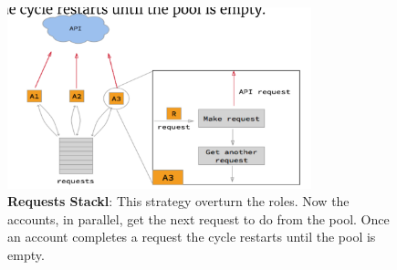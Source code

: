 \documentclass[10pt,a4paper]{article}
\begin{document}
 \pagebreak
     \begin{figure}[ht!]
 \hfill \includegraphics[width=250pt]{images/multi-account-stack}
 \hspace*{\fill}
 \caption{\textbf{Requests Stackl}: This strategy overturn the roles. Now the accounts, in parallel, get the next request to do from the pool. Once an account completes a request the cycle restarts until the pool is empty.}
 \end{figure}
\end{document}
